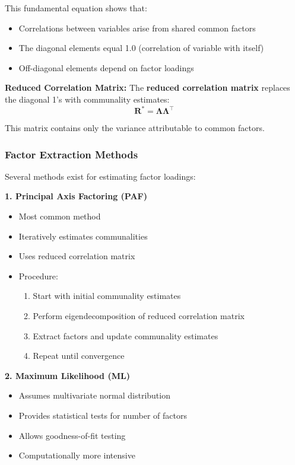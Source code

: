\documentclass[
]{article}
\begin{document}
This fundamental equation shows that:

\begin{itemize}
\item
  Correlations between variables arise from shared common factors
\item
  The diagonal elements equal 1.0 (correlation of variable with itself)
\item
  Off-diagonal elements depend on factor loadings
\end{itemize}

\textbf{Reduced Correlation Matrix:} The \textbf{reduced correlation
matrix} replaces the diagonal 1's with communality estimates:
\[\mathbf{R}^{\ast} = \mathbf{\Lambda}\mathbf{\Lambda}^{\top}\]

This matrix contains only the variance attributable to common factors.

\subsubsection{Factor Extraction Methods}

Several methods exist for estimating factor loadings:

\textbf{1. Principal Axis Factoring (PAF)}

\begin{itemize}
\item
  Most common method
\item
  Iteratively estimates communalities
\item
  Uses reduced correlation matrix
\item
  Procedure:

  \begin{enumerate}
  \item
    Start with initial communality estimates
  \item
    Perform eigendecomposition of reduced correlation matrix
  \item
    Extract factors and update communality estimates
  \item
    Repeat until convergence
  \end{enumerate}
\end{itemize}

\textbf{2. Maximum Likelihood (ML)}

\begin{itemize}
\item
  Assumes multivariate normal distribution
\item
  Provides statistical tests for number of factors
\item
  Allows goodness-of-fit testing
\item
  Computationally more intensive
\end{itemize}
\end{document}
